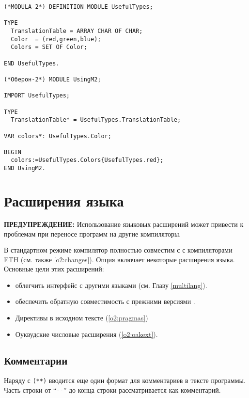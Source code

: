 \Example
\begin{verbatim}
(*MODULA-2*) DEFINITION MODULE UsefulTypes;

TYPE
  TranslationTable = ARRAY CHAR OF CHAR;
  Color  = (red,green,blue);
  Colors = SET OF Color;

END UsefulTypes.

(*Оберон-2*) MODULE UsingM2;

IMPORT UsefulTypes;

TYPE
  TranslationTable* = UsefulTypes.TranslationTable;

VAR colors*: UsefulTypes.Color;

BEGIN
  colors:=UsefulTypes.Colors{UsefulTypes.red};
END UsingM2.
\end{verbatim}

\section{Расширения языка}\label{o2:ext}

{\bf ПРЕДУПРЕЖДЕНИЕ:} Использование языковых расширений может привести 
к проблемам при переносе программ на другие компиляторы.

В стандартном режиме \xds{} \ot{} компилятор полностью совместим с
с компиляторами ETH (см. также \ref{o2:changes}).
Опция  включает некоторые расширения языка.
Основные цели этих расширений:
\begin{itemize}
\item облегчить интерфейс с другими языками
     (см. Главу \ref{multilang}).
\item обеспечить обратную совместимость с прежними версиями \xds{}.
\end{itemize}

\Seealso
\begin{itemize}
\item         Директивы в исходном тексте (\ref{o2:pragmas})
\item         Оуквудские числовые расширения (\ref{o2:oakext}).
\end{itemize}

\subsection{Комментарии}

\oextonly

Наряду с \verb|(**)| вводится еще один формат для комментариев
в тексте программы. Часть строки от
``\verb|--|'' до конца строки рассматривается как комментарий.

